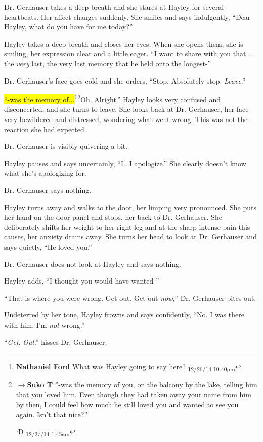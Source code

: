 Dr. Gerhauser takes a deep breath and she stares at Hayley for several heartbeats.  Her affect changes suddenly.  She smiles and says indulgently, ``Dear Hayley, what do you have for me today?''

Hayley takes a deep breath and closes her eyes.  When she opens them, she is smiling, her expression clear and a little eager.  ``I want to share with you that... the \textit{very} last, the very last memory that he held onto the longest-''

Dr. Gerhauser's face goes cold and she orders, ``Stop.  Absolutely stop.  \textit{Leave}.''

\hl{``-was the memory of...}\footnote{\textbf{Nathaniel Ford }What was Hayley going to say here? \textsubscript{12/26/14 10:40pm}}\footnote{$\rightarrow$\textbf{Suko T }''-was the memory of you, on the balcony by the lake, telling him that you loved him.  Even though they had taken away your name from him by then, I could feel how much he still loved you and wanted to see you again.  Isn't that nice?''

:D \textsubscript{12/27/14 1:45am}}Oh.  Alright.'' Hayley looks very confused and disconcerted, and she turns to leave.  She looks back at Dr. Gerhauser, her face very bewildered and distressed, wondering what went wrong.  This was not the reaction she had expected.

Dr. Gerhauser is visibly quivering a bit.

Hayley pauses and says uncertainly, ``I...I apologize.''  She clearly doesn't know what she's apologizing for.

Dr. Gerhauser says nothing.

Hayley turns away and walks to the door, her limping very pronounced.  She puts her hand on the door panel and stops, her back to Dr. Gerhauser.  She deliberately shifts her weight to her right leg and at the sharp intense pain this causes, her anxiety drains away.  She turns her head to look at Dr. Gerhauser and says quietly, ``He loved you.''  

Dr. Gerhauser does not look at Hayley and says nothing.  

Hayley adds, ``I thought you would have wanted-''

``That is where you were wrong.  Get out. Get out \textit{now},'' Dr. Gerhauser bites out.

Undeterred by her tone, Hayley frowns and says confidently, ``No.  I was there with him.  I'm \textit{not} wrong.''

``\textit{Get}.  \textit{Out}.'' hisses Dr. Gerhauser.

